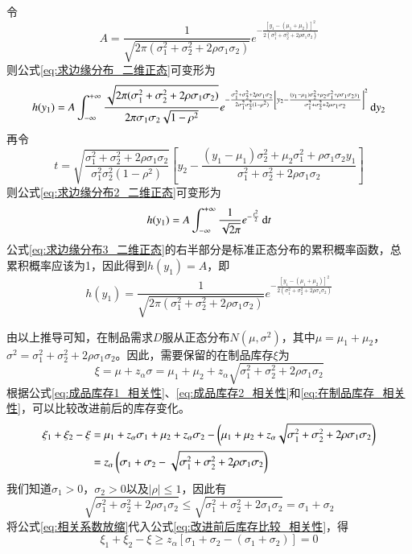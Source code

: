 令
\[
A = \frac{1}{\sqrt{2\pi(\sigma_1^2+\sigma_2^2+2\rho\sigma_1\sigma_2)}}e^{-\frac{[y_1-(\mu_1+\mu_2)]^2}{2(\sigma_1^2+\sigma_2^2+2\rho\sigma_1\sigma_2)}}
\]
则公式\ref{eq:求边缘分布_二维正态}可变形为
\begin{equation}
h(y_1) = A\int_{-\infty}^{+\infty}\frac{\sqrt{2\pi(\sigma_1^2+\sigma_2^2+2\rho\sigma_1\sigma_2)}}{2\pi\sigma_1\sigma_2\sqrt{1-\rho^2}}e^{-\frac{\sigma_1^2+\sigma_2^2+2\rho\sigma_1\sigma_2}{2\sigma_1^2\sigma_2^2(1-\rho^2)}\left[y_2-\frac{(y_1-\mu_1)\sigma_2^2+\mu_2\sigma_1^2+\rho\sigma_1\sigma_2y_1}{\sigma_1^2+\sigma_2^2+2\rho\sigma_1\sigma_2}\right]^2}\operatorname{d\!} y_2
\label{eq:求边缘分布2_二维正态}
\end{equation}
再令
\[
t = \sqrt{\frac{\sigma_1^2+\sigma_2^2+2\rho\sigma_1\sigma_2}{\sigma_1^2\sigma_2^2(1-\rho^2)}}\left[y_2-\frac{(y_1-\mu_1)\sigma_2^2+\mu_2\sigma_1^2+\rho\sigma_1\sigma_2y_1}{\sigma_1^2+\sigma_2^2+2\rho\sigma_1\sigma_2}\right]
\]
则公式\ref{eq:求边缘分布2_二维正态}可变形为
\begin{equation}
h(y_1) = A\int_{-\infty}^{+\infty}\frac{1}{\sqrt{2\pi}}e^{-\frac{t^2}{2}}\operatorname{d\!} t
\label{eq:求边缘分布3_二维正态}
\end{equation}
公式\ref{eq:求边缘分布3_二维正态}的右半部分是标准正态分布的累积概率函数，总累积概率应该为1，因此得到$h(y_1)=A$，即
\begin{equation}
h(y_1) = \frac{1}{\sqrt{2\pi(\sigma_1^2+\sigma_2^2+2\rho\sigma_1\sigma_2)}}e^{-\frac{[y_1-(\mu_1+\mu_2)]^2}{2(\sigma_1^2+\sigma_2^2+2\rho\sigma_1\sigma_2)}}
\label{eq:边缘分布结果_二维正态}
\end{equation}

由以上推导可知，在制品需求$D$服从正态分布$N(\mu,\sigma^2)$，其中$\mu=\mu_1+\mu_2$，$\sigma^2=\sigma_1^2+\sigma_2^2+2\rho\sigma_1\sigma_2$。因此，需要保留的在制品库存$\xi$为
\begin{equation}
\xi = \mu + z_\alpha\sigma = \mu_1 + \mu_2 + z_\alpha\sqrt{\sigma_1^2+\sigma_2^2+2\rho\sigma_1\sigma_2}
\label{eq:在制品库存_相关性}
\end{equation}
根据公式\ref{eq:成品库存1_相关性}、\ref{eq:成品库存2_相关性}和\ref{eq:在制品库存_相关性}，可以比较改进前后的库存变化。
\begin{align}
\xi_1+\xi_2-\xi &= \mu_1 + z_\alpha\sigma_1 + \mu_2 + z_\alpha\sigma_2 - \left(\mu_1 + \mu_2 + z_\alpha\sqrt{\sigma_1^2+\sigma_2^2+2\rho\sigma_1\sigma_2}\right) \notag\\
&= z_\alpha \left(\sigma_1+\sigma_2-\sqrt{\sigma_1^2+\sigma_2^2+2\rho\sigma_1\sigma_2}\right)
\label{eq:改进前后库存比较_相关性}
\end{align}
我们知道$\sigma_1>0$，$\sigma_2>0$以及$|\rho| \leq 1$，因此有
\begin{equation}
\sqrt{\sigma_1^2+\sigma_2^2+2\rho\sigma_1\sigma_2} \leq \sqrt{\sigma_1^2+\sigma_2^2+2\sigma_1\sigma_2} = \sigma_1+\sigma_2
\label{eq:相关系数放缩}
\end{equation}
将公式\ref{eq:相关系数放缩}代入公式\ref{eq:改进前后库存比较_相关性}，得
\begin{equation}
\xi_1+\xi_2-\xi \geq z_\alpha \left[\sigma_1+\sigma_2-(\sigma_1+\sigma_2)\right] = 0
\label{eq:改进前后库存比较结果_相关性}
\end{equation}

